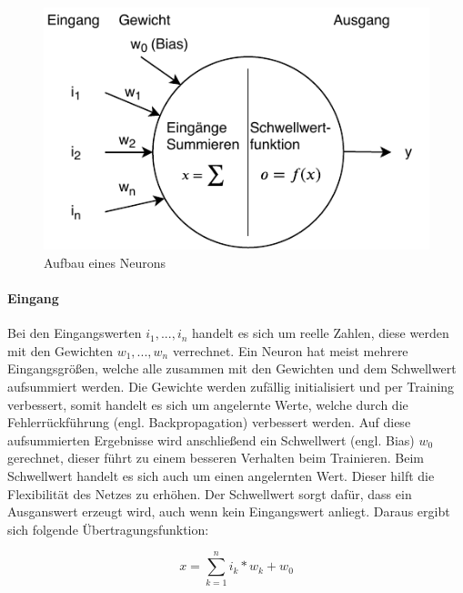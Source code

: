 \begin{figure}[htb]
  \centering  
  \includegraphics[scale=1]{img/neuron.pdf}
  \caption{Aufbau eines Neurons}
  \label{fig:neuron}
\end{figure}


\paragraph{Eingang}
Bei den Eingangswerten $i_1, ..., i_n$ handelt es sich um reelle Zahlen, diese werden mit den Gewichten $w_1, ..., w_n$ verrechnet. Ein Neuron hat meist mehrere Eingangsgrößen, welche alle zusammen mit den Gewichten und dem Schwellwert aufsummiert werden. Die Gewichte werden zufällig initialisiert und per Training verbessert, somit handelt es sich um angelernte Werte, welche durch die Fehlerrückführung (engl. Backpropagation) verbessert werden. Auf diese aufsummierten Ergebnisse wird anschließend ein Schwellwert (engl. Bias) $w_0$ gerechnet, dieser führt zu einem besseren Verhalten beim Trainieren. Beim Schwellwert handelt es sich auch um einen angelernten Wert. Dieser hilft die Flexibilität des Netzes zu erhöhen. Der Schwellwert sorgt dafür, dass ein Ausganswert erzeugt wird, auch wenn kein Eingangswert anliegt. Daraus ergibt sich folgende Übertragungsfunktion:

\begin{equation}
	x = \sum_{k=1}^n i_k * w_k + w_0 \label{eq:1}
\end{equation}

